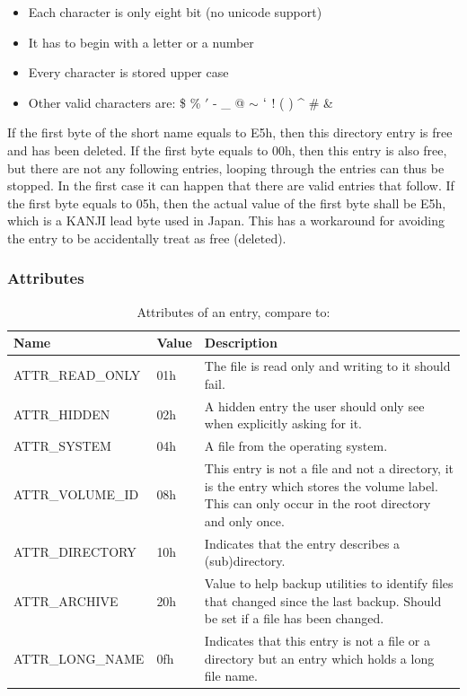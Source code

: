 \begin{itemize}
\item Each character is only eight bit (no unicode support)
\item It has to begin with a letter or a number
\item Every character is stored upper case
\item Other valid characters are: \$ \% $'$ -  \_ @ $\sim$ $`$ ! ( ) { } \^{} \# \&
\end{itemize}

If the first byte of the short name equals to E5h, then this directory entry is free and has been deleted. If the first byte equals to 00h, then this entry is also free, but there are not any following entries, looping through the entries can thus be stopped. In the first case it can happen that there are valid entries that follow. If the first byte equals to 05h, then the actual value of the first byte shall be E5h, which is a KANJI lead byte used in Japan. This has a workaround for avoiding the entry to be accidentally treat as free (deleted).

\subsubsection{Attributes}

\begin{table}[!ht]
\caption{Attributes of an entry, compare to: \cite{usb_ms_jan, fatgen103}}
\centering
\begin{tabular}{|l|l|p{9cm}|}
\hline\hline
\textbf{Name} & \textbf{Value}  & \textbf{Description}\\ \hline
ATTR\_READ\_ONLY & 01h & The file is read only and writing to it should fail. \\ \hline
ATTR\_HIDDEN & 02h & A hidden entry the user should only see when explicitly asking for it. \\ \hline
ATTR\_SYSTEM & 04h & A file from the operating system. \\ \hline
ATTR\_VOLUME\_ID & 08h & This entry is not a file and not a directory, it is the entry which stores the volume label. This can only occur in the root directory and only once. \\ \hline
ATTR\_DIRECTORY & 10h & Indicates that the entry describes a (sub)directory. \\ \hline
ATTR\_ARCHIVE & 20h & Value to help backup utilities to identify files that changed since the last backup. Should be set if a file has been changed. \\ \hline
ATTR\_LONG\_NAME & 0fh & Indicates that this entry is not a file or a directory but an entry which holds a long file name. \\ \hline
\end{tabular}
\label{table:fat_dir_entry_attr}
\end{table}

